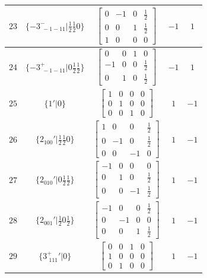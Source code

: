 \documentclass[fleqn,8pt]{jsarticle}
\begin{document}
\begin{longtable}{ccccc}
$ 23 $ & $ \{-3^{-}_{\,\,-1-11}|\frac{1}{2} \frac{1}{2} 0\} $ & $ \begin{bmatrix} 0 & -1 & 0 & \frac{1}{2} \\ 0 & 0 & 1 & \frac{1}{2} \\ 1 & 0 & 0 & 0 \end{bmatrix} $ & $ -1 $ & $ 1 $ \\ \hline
$ 24 $ & $ \{-3^{+}_{\,\,-1-11}|0 \frac{1}{2} \frac{1}{2}\} $ & $ \begin{bmatrix} 0 & 0 & 1 & 0 \\ -1 & 0 & 0 & \frac{1}{2} \\ 0 & 1 & 0 & \frac{1}{2} \end{bmatrix} $ & $ -1 $ & $ 1 $ \\ \hline
$ 25 $ & $ \{1{}'|0\} $ & $ \begin{bmatrix} 1 & 0 & 0 & 0 \\ 0 & 1 & 0 & 0 \\ 0 & 0 & 1 & 0 \end{bmatrix} $ & $ 1 $ & $ -1 $ \\ \hline
$ 26 $ & $ \{2{}_{100}{}'|\frac{1}{2} \frac{1}{2} 0\} $ & $ \begin{bmatrix} 1 & 0 & 0 & \frac{1}{2} \\ 0 & -1 & 0 & \frac{1}{2} \\ 0 & 0 & -1 & 0 \end{bmatrix} $ & $ 1 $ & $ -1 $ \\ \hline
$ 27 $ & $ \{2{}_{010}{}'|0 \frac{1}{2} \frac{1}{2}\} $ & $ \begin{bmatrix} -1 & 0 & 0 & 0 \\ 0 & 1 & 0 & \frac{1}{2} \\ 0 & 0 & -1 & \frac{1}{2} \end{bmatrix} $ & $ 1 $ & $ -1 $ \\ \hline
$ 28 $ & $ \{2{}_{001}{}'|\frac{1}{2} 0 \frac{1}{2}\} $ & $ \begin{bmatrix} -1 & 0 & 0 & \frac{1}{2} \\ 0 & -1 & 0 & 0 \\ 0 & 0 & 1 & \frac{1}{2} \end{bmatrix} $ & $ 1 $ & $ -1 $ \\ \hline
$ 29 $ & $ \{3^{+}_{\,\,111}{}'|0\} $ & $ \begin{bmatrix} 0 & 0 & 1 & 0 \\ 1 & 0 & 0 & 0 \\ 0 & 1 & 0 & 0 \end{bmatrix} $ & $ 1 $ & $ -1 $ \\ \hline

\end{longtable}
\end{document}
